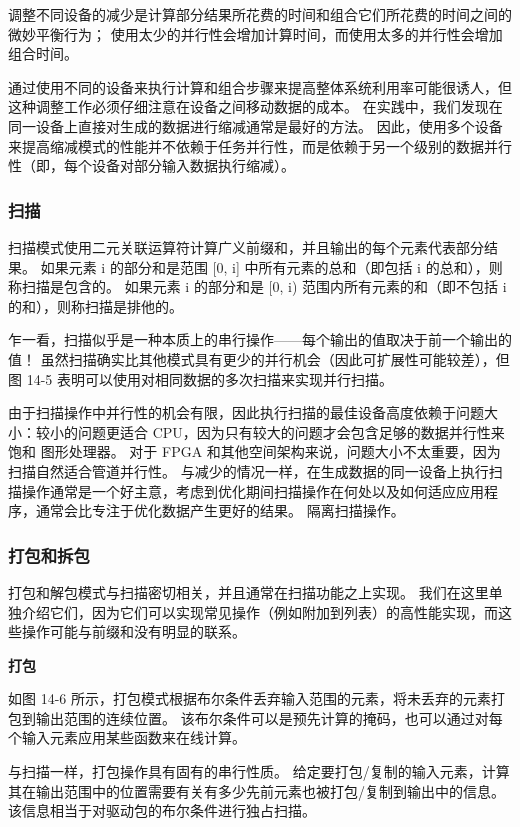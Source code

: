 调整不同设备的减少是计算部分结果所花费的时间和组合它们所花费的时间之间的微妙平衡行为； 使用太少的并行性会增加计算时间，而使用太多的并行性会增加组合时间。

通过使用不同的设备来执行计算和组合步骤来提高整体系统利用率可能很诱人，但这种调整工作必须仔细注意在设备之间移动数据的成本。 在实践中，我们发现在同一设备上直接对生成的数据进行缩减通常是最好的方法。 因此，使用多个设备来提高缩减模式的性能并不依赖于任务并行性，而是依赖于另一个级别的数据并行性（即，每个设备对部分输入数据执行缩减）。

\subsubsection{扫描}
扫描模式使用二元关联运算符计算广义前缀和，并且输出的每个元素代表部分结果。 如果元素 i 的部分和是范围 [0, i] 中所有元素的总和（即包括 i 的总和），则称扫描是包含的。 如果元素 i 的部分和是 [0, i) 范围内所有元素的和（即不包括 i 的和），则称扫描是排他的。

乍一看，扫描似乎是一种本质上的串行操作——每个输出的值取决于前一个输出的值！ 虽然扫描确实比其他模式具有更少的并行机会（因此可扩展性可能较差），但图 14-5 表明可以使用对相同数据的多次扫描来实现并行扫描。

由于扫描操作中并行性的机会有限，因此执行扫描的最佳设备高度依赖于问题大小：较小的问题更适合 CPU，因为只有较大的问题才会包含足够的数据并行性来饱和 图形处理器。 对于 FPGA 和其他空间架构来说，问题大小不太重要，因为扫描自然适合管道并行性。 与减少的情况一样，在生成数据的同一设备上执行扫描操作通常是一个好主意，考虑到优化期间扫描操作在何处以及如何适应应用程序，通常会比专注于优化数据产生更好的结果。 隔离扫描操作。

\subsubsection{打包和拆包}
打包和解包模式与扫描密切相关，并且通常在扫描功能之上实现。 我们在这里单独介绍它们，因为它们可以实现常见操作（例如附加到列表）的高性能实现，而这些操作可能与前缀和没有明显的联系。

\textbf{打包}

如图 14-6 所示，打包模式根据布尔条件丢弃输入范围的元素，将未丢弃的元素打包到输出范围的连续位置。 该布尔条件可以是预先计算的掩码，也可以通过对每个输入元素应用某些函数来在线计算。

与扫描一样，打包操作具有固有的串行性质。 给定要打包/复制的输入元素，计算其在输出范围中的位置需要有关有多少先前元素也被打包/复制到输出中的信息。 该信息相当于对驱动包的布尔条件进行独占扫描。

